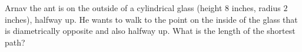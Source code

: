 Arnav the ant is on the outside of a cylindrical glass (height $8$ inches, radius $2$ inches), halfway up. He wants to walk to the point on the inside of the glass that is diametrically opposite and also halfway up. What is the length of the shortest path?
